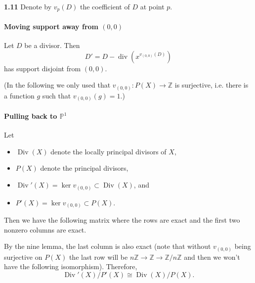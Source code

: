 \documentclass{article}
\makeatletter
\newcommand*{\shifttext}[1]{%
  \settowidth{\@tempdima}{#1}%
  \hspace{-\@tempdima}#1%
}
\newcommand{\plabel}[1]{%
\shifttext{\textbf{#1}\quad}%
}
\makeatother
\begin{document}
\plabel{1.11}%
Denote by $v_p(D)$ the coefficient of $D$ at point $p$.
\paragraph*{Moving support away from $(0,0)$}%
Let $D$ be a divisor.
Then
\[ D' = D - \operatorname{div}(x^{v_{(0,0)}(D) }) \]
has support disjoint from $(0,0)$.
\par
(In the following we only used that $v_{(0,0)}\colon P(X) \to \mathbb{Z}$ is surjective, i.e. there is a function $g$ such that $v_{(0,0)}(g) = 1$.)

\paragraph*{Pulling back to $\mathbb{P}^1$}%
Let
\begin{itemize}
    \item $\operatorname{Div}(X)$ denote the locally principal divisors of $X$,
    \item $P(X)$ denote the principal divisors,
    \item $\operatorname{Div}'(X) = \ker v_{(0,0)} \subset \operatorname{Div}(X)$, and
    \item $P'(X) = \ker v_{(0,0)} \subset P(X)$.
\end{itemize}
Then we have the following matrix where the rows are exact and the first two nonzero columns are exact.
\begin{center}
\end{center}
By the nine lemma, the last column is also exact (note that without $v_{(0,0)}$ being surjective on $P(X)$ the last row will be $n\mathbb{Z} \rightarrow \mathbb{Z} \rightarrow \mathbb{Z}/n\mathbb{Z}$ and then we won't have the following isomorphism).
Therefore,
\begin{equation}
    \label{eq:restrict}
    \operatorname{Div}'(X)/P'(X) \cong \operatorname{Div}(X)/P(X).
\end{equation}
\end{document}
